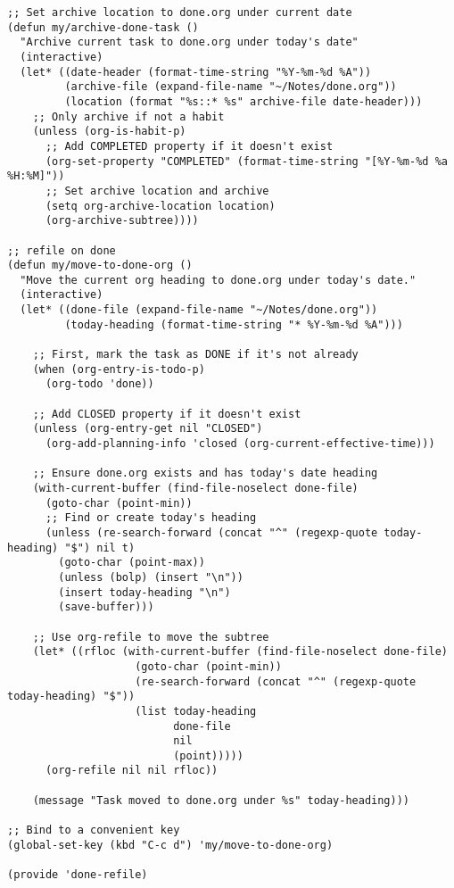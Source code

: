 \documentclass[11pt]{article}
\begin{document}
\begin{verbatim}
;; Set archive location to done.org under current date
(defun my/archive-done-task ()
  "Archive current task to done.org under today's date"
  (interactive)
  (let* ((date-header (format-time-string "%Y-%m-%d %A"))
         (archive-file (expand-file-name "~/Notes/done.org"))
         (location (format "%s::* %s" archive-file date-header)))
    ;; Only archive if not a habit
    (unless (org-is-habit-p)
      ;; Add COMPLETED property if it doesn't exist
      (org-set-property "COMPLETED" (format-time-string "[%Y-%m-%d %a %H:%M]"))
      ;; Set archive location and archive
      (setq org-archive-location location)
      (org-archive-subtree))))

;; refile on done
(defun my/move-to-done-org ()
  "Move the current org heading to done.org under today's date."
  (interactive)
  (let* ((done-file (expand-file-name "~/Notes/done.org"))
         (today-heading (format-time-string "* %Y-%m-%d %A")))

    ;; First, mark the task as DONE if it's not already
    (when (org-entry-is-todo-p)
      (org-todo 'done))

    ;; Add CLOSED property if it doesn't exist
    (unless (org-entry-get nil "CLOSED")
      (org-add-planning-info 'closed (org-current-effective-time)))

    ;; Ensure done.org exists and has today's date heading
    (with-current-buffer (find-file-noselect done-file)
      (goto-char (point-min))
      ;; Find or create today's heading
      (unless (re-search-forward (concat "^" (regexp-quote today-heading) "$") nil t)
        (goto-char (point-max))
        (unless (bolp) (insert "\n"))
        (insert today-heading "\n")
        (save-buffer)))

    ;; Use org-refile to move the subtree
    (let* ((rfloc (with-current-buffer (find-file-noselect done-file)
                    (goto-char (point-min))
                    (re-search-forward (concat "^" (regexp-quote today-heading) "$"))
                    (list today-heading
                          done-file
                          nil
                          (point)))))
      (org-refile nil nil rfloc))

    (message "Task moved to done.org under %s" today-heading)))

;; Bind to a convenient key
(global-set-key (kbd "C-c d") 'my/move-to-done-org)

(provide 'done-refile)
\end{verbatim}
\end{document}
